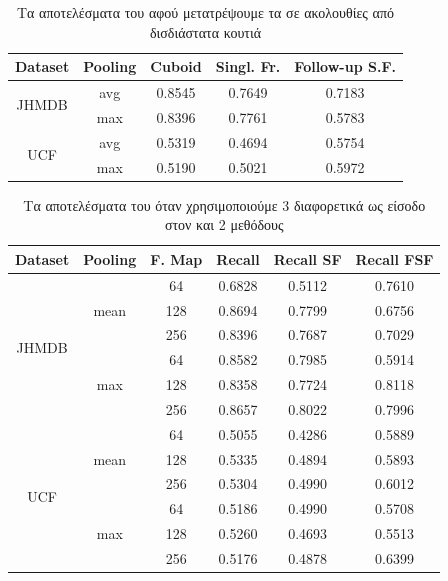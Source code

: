 \en
\begin{table}[h]
  \en
  \centering
  \begin{tabular} {||c | c || c | c | c ||}
    \hline
    \textbf{Dataset} & \textbf{Pooling} & \textbf{Cuboid} & \textbf{Singl. Fr. } &  \textbf{Follow-up S.F.}\\
    \hline                
    \multirow{2}{*}{JHMDB} & avg & 0.8545 & 0.7649 & 0.7183 \\
    \cline{2-5}
    {} & max & 0.8396 & 0.7761 & 0.5783 \\
    \cline{1-5}
    \multirow{2}{*}{UCF} & avg & 0.5319 & 0.4694 & 0.5754 \\
    \cline{2-5}
    {} & max & 0.5190 & 0.5021 & 0.5972 \\
    \cline{1-5}
                                   
  \end{tabular}
  \caption{\gr Τα αποτελέσματα του  αφού μετατρέψουμε τα  σε ακολουθίες από δισδιάστατα κουτιά }
  \label{table:gr_reg_1_1}
\end{table}
\gr
\en
\begin{table}[h]
  \en
  \centering
  \begin{tabular}{||c | c | c || c  c  c ||}
    \hline
    \textbf{Dataset} & \textbf{Pooling} & \textbf{F. Map} & \textbf{Recall} &  \textbf{ Recall SF}  &  \textbf{Recall FSF} \\
    \hline
    \multirow{6}{*}{JHMDB} & \multirow{3}{*}{mean} & 64 &  0.6828  & 0.5112  & 0.7610 \\
    \cline{3-6}
    {} & {} & 128 & 0.8694 & 0.7799 & 0.6756 \\
    \cline{3-6}
    {} & {} & 256 & 0.8396 & 0.7687 & 0.7029 \\
    \cline{2-6}
    {} & \multirow{3}{*}{max} & 64 &  0.8582 & 0.7985 & 0.5914\\
    \cline{3-6}
    {} & {} & 128 & 0.8358 & 0.7724 & 0.8118 \\
    \cline{3-6}
    {} & {} & 256 & 0.8657 & 0.8022 & 0.7996 \\
    \hline
    \multirow{6}{*}{UCF} & \multirow{3}{*}{mean} & 64 & 0.5055 & 0.4286 & 0.5889 \\
    \cline{3-6}
    {} & {} & 128 & 0.5335 & 0.4894 & 0.5893 \\
    \cline{3-6}
    {} & {} & 256 & 0.5304 & 0.4990 & 0.6012 \\
    \cline{2-6}
    {} & \multirow{3}{*}{max} & 64 & 0.5186 & 0.4990 & 0.5708 \\
    \cline{3-6}
    {} & {} & 128 & 0.5260 & 0.4693 & 0.5513 \\
    \cline{3-6}
    {} & {} & 256 & 0.5176 & 0.4878 & 0.6399 \\
    \hline

  \end{tabular}
  \caption{\gr Τα αποτελέσματα του  όταν χρησιμοποιούμε 3 διαφορετικά  ως είσοδο στον
   και 2  μεθόδους}
  \label{table:gr_reg_1_2}
\end{table}
